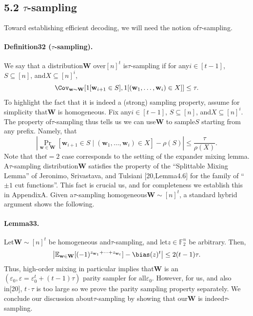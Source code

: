 \subsection*{5.2 $\tau$-sampling}
Toward establishing efficient decoding, we will need the notion of$\tau$-sampling.
\paragraph{Definition32 ($\tau$-sampling).} We say that a distribution$\mathbf W$ over$[n]^t$ is$\tau$-sampling if for any$i\in[t-1]$, $S\subseteq[n]$, and$X\subseteq[n]^i$,
\[\Cov_{\mathbf w\sim\mathbf W}[1[\mathbf w_{i+1}\in S],1[(\mathbf w_1,\ldots,\mathbf w_i)\in X]]\leq\tau.\]
To highlight the fact that it is indeed a (strong) sampling property, assume for simplicity that$\mathbf W$ is homogeneous. Fix any$i\in[t-1]$, $S\subseteq[n]$, and$X\subseteq[n]^i$. The property of$\tau$-sampling thus tells us we can use$\mathbf W$ to sample$S$ starting from any prefix. Namely, that
\[\left|\Pr_{\mathbf w\in\mathbf W}[\mathbf w_{i+1}\in S\mid(\mathbf w_1,\ldots,\mathbf w_i)\in X]-\rho(S)\right|\leq\frac\tau{\rho(X)}.\]
Note that the$t=2$ case corresponds to the setting of the expander mixing lemma.
A$\tau$-sampling distribution$\mathbf W$ satisfies the property of the ``Splittable Mixing Lemma'' of Jeronimo, Srivastava, and Tulsiani [20,Lemma4.6] for the family of ``$\pm1$ cut functions''. This fact is crucial us, and for completeness we establish this in AppendixA.
Given a$\tau$-sampling homogeneous$\mathbf W\sim[n]^t$, a standard hybrid argument shows the following.
\paragraph{Lemma33.} Let$\mathbf W\sim[n]^t$ be homogeneous and$\tau$-sampling, and let$z\in\mathbb F_2^n$ be arbitrary. Then,
\[\left|\mathbb E_{\mathbf w\in\mathbf W}[(-1)^{z_{\mathbf w_1}+\cdots+z_{\mathbf w_t}}]-\bias(z)^t\right|\leq2(t-1)\tau.\]
Thus, high-order mixing in particular implies that$\mathbf W$ is an$(\varepsilon_0,\varepsilon=\varepsilon_0^t+(t-1)\tau)$ parity sampler for all$\varepsilon_0$. However, for us, and also in[20], $t\cdot\tau$ is too large so we prove the parity sampling property separately.
We conclude our discussion about$\tau$-sampling by showing that our$\mathbf W$ is indeed$\tau$-sampling.
